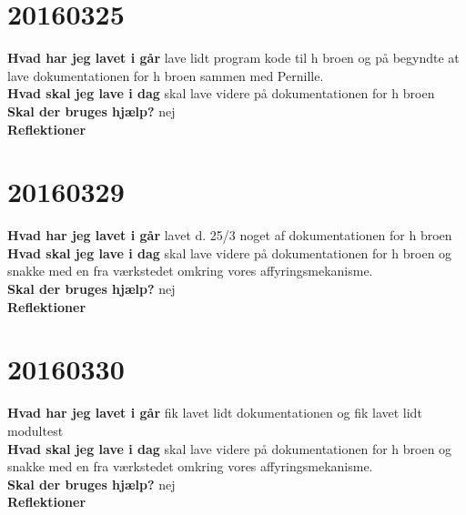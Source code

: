 \documentclass{article}
\begin{document}
					\section{20160325}
					
					\textbf{Hvad har jeg lavet i går}
					lave lidt program kode til h broen og på begyndte at lave dokumentationen for h broen sammen med Pernille. 
					\\
					\textbf{Hvad skal jeg lave i dag}
					skal lave videre på dokumentationen for h broen  
					\\
					\textbf{Skal der bruges hjælp?}
					nej
					\\
					\textbf{Reflektioner}
					
	\section{20160329}
	
	\textbf{Hvad har jeg lavet i går}
	lavet d. 25/3 noget af dokumentationen for h broen  
	\\
	\textbf{Hvad skal jeg lave i dag}
	skal lave videre på dokumentationen for h broen og snakke med en fra værkstedet omkring vores affyringsmekanisme.  
	\\
	\textbf{Skal der bruges hjælp?}
	nej
	\\
	\textbf{Reflektioner}
	
		\section{20160330}
		
		\textbf{Hvad har jeg lavet i går}
		fik lavet lidt dokumentationen og fik lavet lidt modultest
		\\
		\textbf{Hvad skal jeg lave i dag}
		skal lave videre på dokumentationen for h broen og snakke med en fra værkstedet omkring vores affyringsmekanisme.  
		\\
		\textbf{Skal der bruges hjælp?}
		nej
		\\
		\textbf{Reflektioner}
\end{document}
